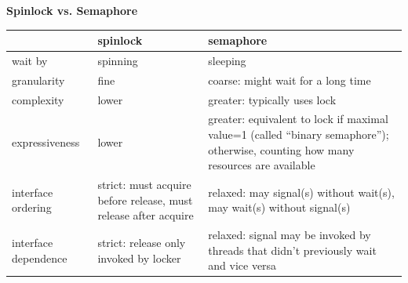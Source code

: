 \documentclass[openany,12pt]{book}
\begin{document}
\begin{samepage}
    \begin{center}
        \textbf{Spinlock vs. Semaphore}
        \begin{tabular}{|>{\raggedright\arraybackslash}p{3cm}|
            >{\raggedright\arraybackslash}p{4cm}|
            >{\raggedright\arraybackslash}p{6cm}|}
            \hline
            \rowcolor{blue!30}
                                 & \textbf{spinlock}                                               & \textbf{semaphore}                                                                                                                 \\
            \hline
            wait by              & spinning                                                        & sleeping                                                                                                                           \\
            granularity          & fine                                                            & coarse: might wait for a long time                                                                                                 \\
            complexity           & lower                                                           & greater: typically uses lock                                                                                                       \\
            expressiveness       & lower                                                           & greater: equivalent to lock if maximal value=1 (called ``binary semaphore''); otherwise, counting how many resources are available \\
            interface ordering   & strict: must acquire before release, must release after acquire & relaxed: may signal(s) without wait(s), may wait(s) without signal(s)                                                              \\
            interface dependence & strict: release only invoked by locker                          & relaxed: signal may be invoked by threads that didn't previously wait and vice versa                                               \\
            \hline
        \end{tabular}
    \end{center}
\end{samepage}
\end{document}
